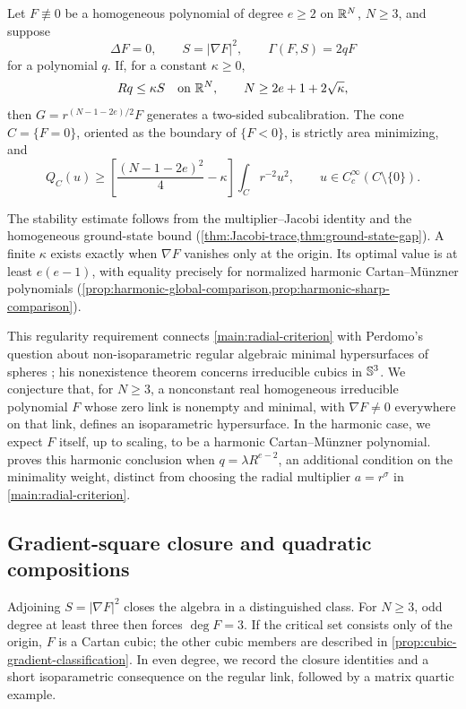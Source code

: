 \begin{maintheorem}
\label{main:radial-criterion}
Let $F\not\equiv0$ be a homogeneous polynomial of degree $e\ge2$
on $\mathbb R^N$, $N\ge3$, and suppose
\[
 \Delta F=0,\qquad S=|\nabla F|^2,\qquad \Gamma(F,S)=2qF
\]
for a polynomial $q$. If, for a constant $\kappa\ge0$,
\[
 Rq\le\kappa S\quad\text{on }\mathbb R^N,\qquad
 N\ge2e+1+2\sqrt\kappa,
\]
then $G=r^{(N-1-2e)/2}F$ generates a two-sided subcalibration.
The cone $C=\{F=0\}$, oriented as the boundary of $\{F<0\}$,
is strictly area minimizing, and
\[
 Q_C(u)\ge\left[\frac{(N-1-2e)^2}{4}-\kappa\right]
       \int_Cr^{-2}u^2,\qquad u\in C_c^\infty(C\setminus\{0\}).
\]
\end{maintheorem}
The stability estimate follows from the multiplier--Jacobi identity
and the homogeneous ground-state bound
(\cref{thm:Jacobi-trace,thm:ground-state-gap}).
A finite $\kappa$ exists exactly when $\nabla F$ vanishes only at
the origin. Its optimal value is at least $e(e-1)$, with equality
precisely for normalized harmonic Cartan--M\"unzner polynomials
(\cref{prop:harmonic-global-comparison,prop:harmonic-sharp-comparison}).

\begin{remark}
\label{rem:regular-algebraic-realizability}
This regularity requirement connects \cref{main:radial-criterion}
with Perdomo's question about non-isoparametric regular algebraic
minimal hypersurfaces of spheres
\cite[Section~1 and Main theorem]{PerdomoRegular2006}; his nonexistence
theorem concerns irreducible cubics in \(\mathbb S^3\).
We conjecture that, for \(N\ge3\), a nonconstant real homogeneous
irreducible polynomial \(F\) whose zero link is nonempty and minimal,
with \(\nabla F\ne0\) everywhere on that link, defines an
isoparametric hypersurface. In the harmonic case, we expect \(F\)
itself, up to scaling, to be a harmonic Cartan--M\"unzner polynomial.
 proves this harmonic
conclusion when \(q=\lambda R^{e-2}\), an additional condition on
the minimality weight, distinct from choosing the radial multiplier
\(a=r^\sigma\) in \cref{main:radial-criterion}.
\end{remark}

\subsection{Gradient-square closure and quadratic compositions}

Adjoining $S=|\nabla F|^2$ closes the algebra in a distinguished
class. For $N\ge3$, odd degree at least three then forces
$\deg F=3$. If the critical set consists only of the origin, $F$
is a Cartan cubic; the other cubic members are described in
\cref{prop:cubic-gradient-classification}.
In even degree, we record the closure identities and a short
isoparametric consequence on the regular link, followed by a matrix
quartic example.

